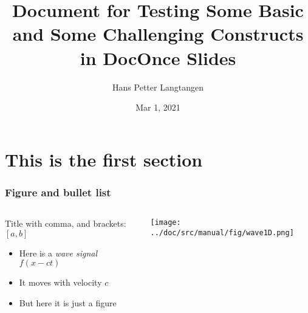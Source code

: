 \documentclass{beamer}
\begin{document}

\newcommand{\exercisesection}[1]{\subsection*{#1}}









\title{Document for Testing Some Basic and Some Challenging Constructs in DocOnce Slides}


\author{Hans Petter Langtangen}

\date{Mar 1, 2021
}

\begin{frame}
\titlepage
\end{frame}

\section[First]{This is the first section}

\begin{frame}
\frametitle{Figure and bullet list}

\begin{columns}
\pause
\begin{block}{Title with comma, and brackets: $[a,b]$ }
\footnotesize

\begin{itemize}
  \item Here is a \emph{wave signal} $f(x-ct)$

  \item It moves with velocity $c$

  \item But here it is just a figure
\end{itemize}

\noindent
\end{block}

\begin{block}{}

\vspace{6mm}

\centerline{\texttt{[image: ../doc/src/manual/fig/wave1D.png]}}

\vspace{6mm}

\end{block}

\end{columns}
\end{frame}
\end{document}
